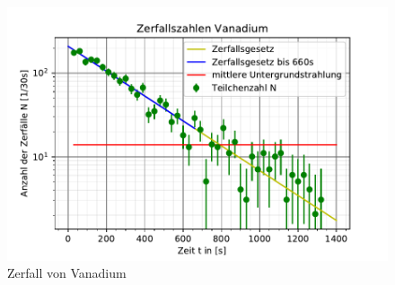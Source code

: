 \begin{figure}
    \centering
    \includegraphics{vanadium.pdf}
    \caption{Zerfall von Vanadium}
    \label{fig:vanadium}
  \end{figure}

